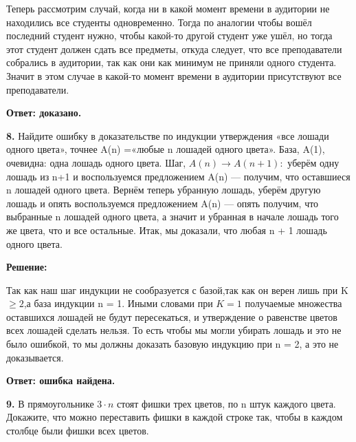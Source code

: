 \documentclass[a4paper,12pt]{article} %
\begin{document}
Теперь рассмотрим случай, когда ни в какой момент времени в аудитории не находились все студенты одновременно. Тогда по аналогии чтобы вошёл последний студент нужно, чтобы какой-то другой студент уже ушёл, но тогда этот студент должен сдать все предметы, откуда следует, что все преподаватели собрались в аудитории, так как они как минимум не приняли одного студента. Значит в этом случае в какой-то момент времени в аудитории присутствуют все преподаватели.



\begin{flushright}
\begin{large}
\textbf {Ответ: доказано.}
\end{large}
\end{flushright}


{\bf 8. }Найдите ошибку в доказательстве по индукции утверждения «все
лошади одного цвета», точнее A(n) =«любые n лошадей одного цвета».
База, A(1), очевидна: одна лошадь одного цвета. Шаг, $A(n) \rightarrow A(n + 1):$
уберём одну лошадь из n+1 и воспользуемся предложением A(n) — получим, что оставшиеся n лошадей одного цвета. Вернём теперь убранную
лошадь, уберём другую лошадь и опять воспользуемся предложением
A(n) — опять получим, что выбранные n лошадей одного цвета, а значит и убранная в начале лошадь того же цвета, что и все остальные.
Итак, мы доказали, что любая n + 1 лошадь одного цвета.
 
\newpage
\begin{center}
\bfseries
{\Large Решение: }
\end{center}
Так как наш шаг индукции не сообразуется с базой,так как он верен лишь при K$\geqslant 2$,а база индукции n = 1. Иными словами при ${\displaystyle K=1}$ получаемые множества оставшихся лошадей не будут пересекаться, и утверждение о равенстве цветов всех лошадей сделать нельзя. То есть чтобы мы могли убирать лошадь и это не было ошибкой, то мы должны доказать базовую индукцию при n = 2, а это не доказывается.
\begin{flushright}
\begin{large}
\textbf {Ответ: ошибка найдена.}
\end{large}
\end{flushright}

{\bf 9. }В прямоугольнике $3\cdot n$ стоят фишки трех цветов, по n штук каждого
цвета. Докажите, что можно переставить фишки в каждой строке так,
чтобы в каждом столбце были фишки всех цветов.
\end{document}

